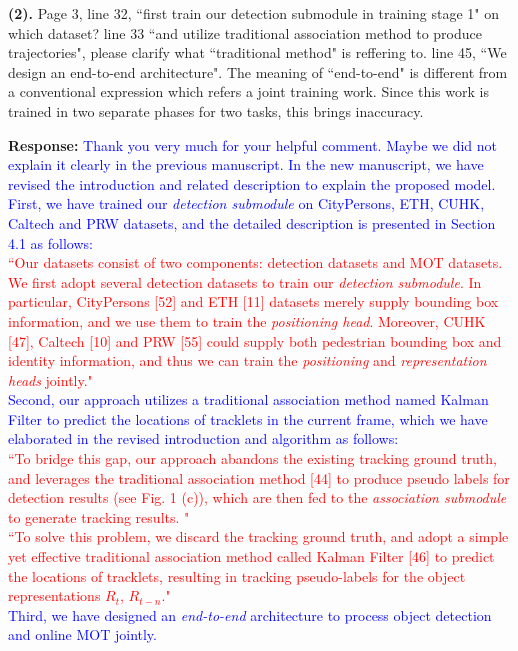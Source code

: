 \documentclass[12pt,journal,onecolumn]{IEEEtran}
\begin{document}
\textbf{(2).} Page 3, line 32, ``first train our detection submodule in training stage 1" on which dataset? 
line 33 ``and utilize traditional association method to produce trajectories", please clarify what ``traditional method" is reffering to. 
line 45, ``We design an end-to-end architecture". 
The meaning of ``end-to-end" is different from a conventional expression which refers a joint training work. 
Since this work is trained in two separate phases for two tasks, this brings inaccuracy.

\textbf{Response:} \textcolor{blue}{Thank you very much for your helpful comment. 
Maybe we did not explain it clearly in the previous manuscript. 
In the new manuscript, we have revised the introduction and related description to explain the proposed model. 
First, we have trained our \emph{detection submodule} on CityPersons, ETH, CUHK, Caltech and PRW datasets, and the detailed description is presented in Section 4.1 as follows: \\
\textcolor{red}{
``Our datasets consist of two components: detection datasets and MOT datasets.
We first adopt several detection datasets to train our \emph{detection submodule}. In particular, CityPersons [52] and ETH [11] datasets merely supply bounding box information, 
and we use them to train the \emph{positioning head}. 
\textcolor{red}{Moreover, }CUHK [47], Caltech [10] and PRW [55] could supply both pedestrian bounding box and identity information,
and thus we can train the \emph{positioning} and \emph{representation heads} jointly."
} \\
Second, our approach utilizes a traditional association method named Kalman Filter to predict the locations of tracklets in the current frame, which we have elaborated in the revised introduction and algorithm as follows: \\
\textcolor{red}{
``To bridge this gap, our approach abandons the existing tracking ground truth,
and leverages the traditional association method [44] to produce pseudo labels for detection results (see Fig. 1 (c)), 
which are then fed to the \emph{association submodule} to generate tracking results.  "
} \\
\textcolor{red}{
``To solve this problem, we discard the tracking ground truth, and adopt a simple yet effective traditional association method called Kalman Filter [46] to predict the locations of tracklets, resulting in tracking pseudo-labels for the object representations $R_t$, $R_{t-n}$."
} \\
Third, we have designed an \emph{end-to-end} architecture to process object detection and online MOT jointly. 
}
\end{document}
